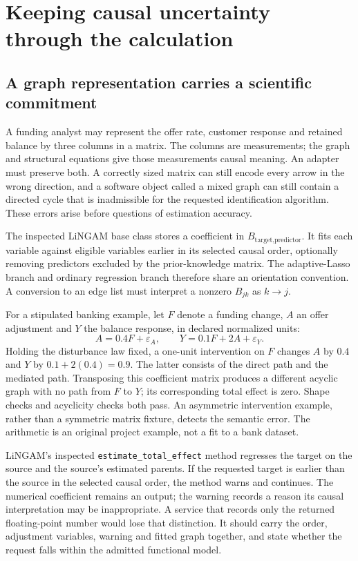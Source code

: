 \chapter{Keeping causal uncertainty through the calculation}
\label{v131:graph-uncertainty}

\section{A graph representation carries a scientific commitment}

A funding analyst may represent the offer rate, customer response and retained
balance by three columns in a matrix. The columns are measurements; the graph
and structural equations give those measurements causal meaning. An adapter
must preserve both. A correctly sized matrix can still encode every arrow in
the wrong direction, and a software object called a mixed graph can still
contain a directed cycle that is inadmissible for the requested identification
algorithm. These errors arise before questions of estimation accuracy.

The inspected LiNGAM base class stores a coefficient in
$B_{\text{target},\text{predictor}}$. It fits each variable against eligible
variables earlier in its selected causal order, optionally removing predictors
excluded by the prior-knowledge matrix. The adaptive-Lasso branch and ordinary
regression branch therefore share an orientation convention. A conversion to
an edge list must interpret a nonzero $B_{jk}$ as $k\to j$.
\cite{v131_sw_lingam}

For a stipulated banking example, let $F$ denote a funding change, $A$ an offer
adjustment and $Y$ the balance response, in declared normalized units:
\[
 A=0.4F+\varepsilon_A,\qquad
 Y=0.1F+2A+\varepsilon_Y.
\]
Holding the disturbance law fixed, a one-unit intervention on $F$ changes $A$
by $0.4$ and $Y$ by $0.1+2(0.4)=0.9$. The latter consists of the direct path
and the mediated path. Transposing this coefficient matrix produces a different
acyclic graph with no path from $F$ to $Y$; its corresponding total effect is
zero. Shape checks and acyclicity checks both pass. An asymmetric intervention
example, rather than a symmetric matrix fixture, detects the semantic error.
The arithmetic is an original project example, not a fit to a bank dataset.
\cite{v131_project_semantics}

LiNGAM's inspected \texttt{estimate\_total\_effect} method regresses the target
on the source and the source's estimated parents. If the requested target is
earlier than the source in the selected causal order, the method warns and
continues. The numerical coefficient remains an output; the warning records a
reason its causal interpretation may be inappropriate. A service that records
only the returned floating-point number would lose that distinction. It should
carry the order, adjustment variables, warning and fitted graph together, and
state whether the request falls within the admitted functional model.
\cite{v131_sw_lingam}

